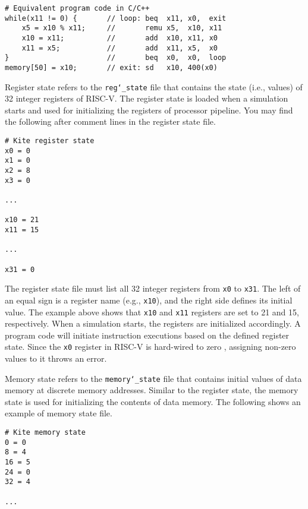 \documentclass[10pt]{article}
\begin{document}
\begin{Verbatim}[frame=single,fontsize=\small]
# Equivalent program code in C/C++
while(x11 != 0) {       // loop: beq  x11, x0,  exit
    x5 = x10 % x11;     //       remu x5,  x10, x11
    x10 = x11;          //       add  x10, x11, x0
    x11 = x5;           //       add  x11, x5,  x0
}                       //       beq  x0,  x0,  loop
memory[50] = x10;       // exit: sd   x10, 400(x0)
\end{Verbatim}

Register state refers to the {\tt reg\char`_state} file that contains the state (i.e., values) of 32 integer registers of RISC-V.
The register state is loaded when a simulation starts and used for initializing the registers of processor pipeline.
You may find the following after comment lines in the register state file.

\begin{Verbatim}[frame=single,fontsize=\small]
# Kite register state
x0 = 0
x1 = 0
x2 = 8
x3 = 0

...

x10 = 21
x11 = 15

...

x31 = 0
\end{Verbatim}

The register state file must list all 32 integer registers from {\tt x0} to {\tt x31}.
The left of an equal sign is a register name (e.g., {\tt x10}), and the right side defines its initial value.
The example above shows that {\tt x10} and {\tt x11} registers are set to 21 and 15, respectively.
When a simulation starts, the registers are initialized accordingly.
A program code will initiate instruction executions based on the defined register state.
Since the {\tt x0} register in RISC-V is hard-wired to zero \cite{patterson_morgan2017}, assigning non-zero values to it throws an error.

Memory state refers to the {\tt memory\char`_state} file that contains initial values of data memory at discrete memory addresses.
Similar to the register state, the memory state is used for initializing the contents of data memory.
The following shows an example of memory state file.

\begin{Verbatim}[frame=single,fontsize=\small]
# Kite memory state
0 = 0
8 = 4
16 = 5
24 = 0
32 = 4

...

\end{Verbatim}
\end{document}
